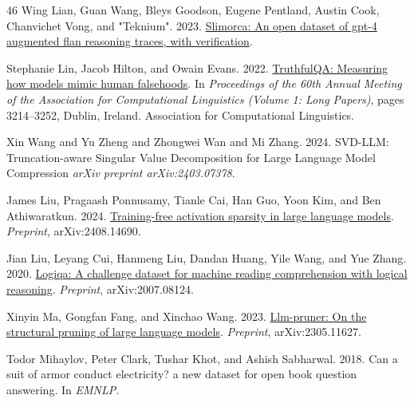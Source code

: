\documentclass[11pt]{article}
\begin{document}
\begin{thebibliography}{46}
Wing Lian, Guan Wang, Bleys Goodson, Eugene Pentland, Austin Cook, Chanvichet Vong, and "Teknium". 2023.
\newblock \href {https://https://huggingface.co/Open-Orca/SlimOrca} {Slimorca: An open dataset of gpt-4 augmented flan reasoning traces, with verification}.

Stephanie Lin, Jacob Hilton, and Owain Evans. 2022.
\newblock \href {https://doi.org/10.18653/v1/2022.acl-long.229} {{T}ruthful{QA}: Measuring how models mimic human falsehoods}.
\newblock In \emph{Proceedings of the 60th Annual Meeting of the Association for Computational Linguistics (Volume 1: Long Papers)}, pages 3214--3252, Dublin, Ireland. Association for Computational Linguistics.

Xin Wang and Yu Zheng and Zhongwei Wan and Mi Zhang. 2024.
\newblock SVD-LLM: Truncation-aware Singular Value Decomposition for Large Language Model Compression
\newblock \emph{arXiv preprint arXiv:2403.07378}.

James Liu, Pragaash Ponnusamy, Tianle Cai, Han Guo, Yoon Kim, and Ben Athiwaratkun. 2024.
\newblock \href {https://arxiv.org/abs/2408.14690} {Training-free activation sparsity in large language models}.
\newblock \emph{Preprint}, arXiv:2408.14690.

Jian Liu, Leyang Cui, Hanmeng Liu, Dandan Huang, Yile Wang, and Yue Zhang. 2020.
\newblock \href {https://arxiv.org/abs/2007.08124} {Logiqa: A challenge dataset for machine reading comprehension with logical reasoning}.
\newblock \emph{Preprint}, arXiv:2007.08124.

Xinyin Ma, Gongfan Fang, and Xinchao Wang. 2023.
\newblock \href {https://arxiv.org/abs/2305.11627} {Llm-pruner: On the structural pruning of large language models}.
\newblock \emph{Preprint}, arXiv:2305.11627.

Todor Mihaylov, Peter Clark, Tushar Khot, and Ashish Sabharwal. 2018.
\newblock Can a suit of armor conduct electricity? a new dataset for open book question answering.
\newblock In \emph{EMNLP}.


\end{thebibliography}
\end{document}
